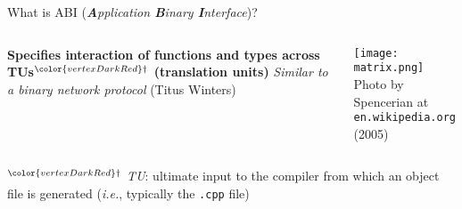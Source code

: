 \begin{frame}
    \centering
    \scalebox{3}{What is ABI?}
\end{frame}

\begin{frame}{What is ABI (\textit{\textbf{A}pplication \textbf{B}inary \textbf{I}nterface})?}
    \begin{columns}
        \begin{column}{.6\textwidth}
            \textbf{Specifies interaction of functions and types across TUs${}^{\color{vertexDarkRed}\dagger}$ (translation units)}
            \textit{Similar to a binary network protocol} (Titus Winters)
        \end{column}
        \begin{column}{.3\textwidth}
            \centering
            \texttt{[image: matrix.png]}\\
            {\footnotesize Photo by Spencerian at \texttt{en.wikipedia.org} (2005)}
        \end{column}
    \end{columns}

    \vspace{5mm}

    \footnotesize ${}^{\color{vertexDarkRed}\dagger}$ \textit{TU}: ultimate input to the compiler from which an object file is generated (\textit{i.e.}, typically the \texttt{.cpp} file)
\end{frame}

